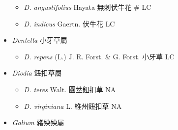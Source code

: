 \begin{itemize}
  \begin{itemize}
        \item[] \textit{D. angustifolius} Hayata  無刺伏牛花  \# LC
        \item[] \textit{D. indicus} Gaertn.  伏牛花   LC
  \end{itemize}
 \item[] \textit{Dentella} 小牙草屬
                                
  \begin{itemize}
        \item[] \textit{D. repens} (L.) J. R. Forst. \& G. Forst.  小牙草   LC
  \end{itemize}
 \item[] \textit{Diodia} 鈕扣草屬
                                
  \begin{itemize}
        \item[] \textit{D. teres} Walt.  圓莖鈕扣草   NA
        \item[] \textit{D. virginiana} L.  維州鈕扣草   NA
  \end{itemize}
 \item[] \textit{Galium} 豬殃殃屬
                                

\end{itemize}
